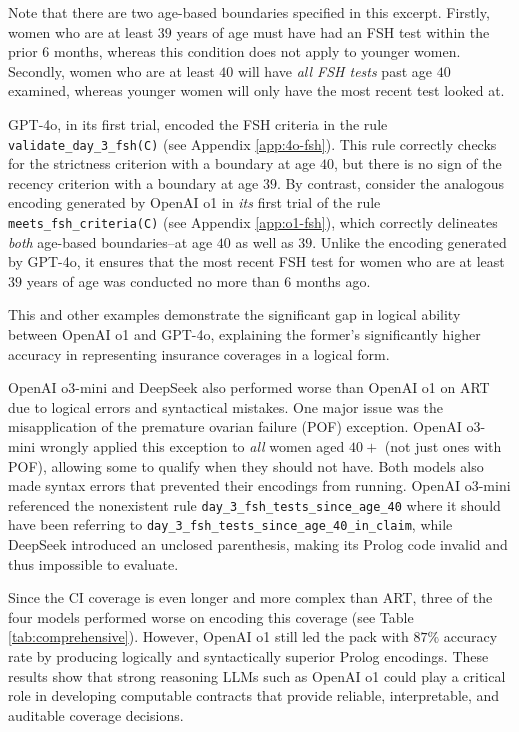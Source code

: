 Note that there are two age-based boundaries specified in this excerpt. Firstly, women who are at least $39$ years of age must have had an FSH test within the prior $6$ months, whereas this condition does not apply to younger women. Secondly, women who are at least $40$ will have \emph{all FSH tests} past age $40$ examined, whereas younger women will only have the most recent test looked at.

GPT-4o, in its first trial, encoded the FSH criteria in the rule \verb|validate_day_3_fsh(C)| (see Appendix \ref{app:4o-fsh}). This rule correctly checks for the strictness criterion with a boundary at age $40$, but there is no sign of the recency criterion with a boundary at age $39$. By contrast, consider the analogous encoding generated by OpenAI o1 in \emph{its} first trial of the rule \verb|meets_fsh_criteria(C)| (see Appendix \ref{app:o1-fsh}), which correctly delineates \emph{both} age-based boundaries--at age $40$ as well as $39$. Unlike the encoding generated by GPT-4o, it ensures that the most recent FSH test for women who are at least $39$ years of age was conducted no more than $6$ months ago.

This and other examples demonstrate the significant gap in logical ability between OpenAI o1 and GPT-4o, explaining the former's significantly higher accuracy in representing insurance coverages in a logical form.

OpenAI o3-mini and DeepSeek also performed worse than OpenAI o1 on ART due to logical errors and syntactical mistakes. One major issue was the misapplication of the premature ovarian failure (POF) exception. OpenAI o3-mini wrongly applied this exception to \emph{all} women aged $40+$ (not just ones with POF), allowing some to qualify when they should not have. Both models also made syntax errors that prevented their encodings from running. OpenAI o3-mini referenced the nonexistent rule \texttt{day\_3\_fsh\_tests\_since\_age\_40} where it should have been referring to \texttt{day\_3\_fsh\_tests\_since\_age\_40\_in\_claim}, while DeepSeek introduced an unclosed parenthesis, making its Prolog code invalid and thus impossible to evaluate.

Since the CI coverage is even longer and more complex than ART, three of the four models performed worse on encoding this coverage (see Table \ref{tab:comprehensive}). However, OpenAI o1 still led the pack with $87\%$ accuracy rate by producing logically and syntactically superior Prolog encodings. These results show that strong reasoning LLMs such as OpenAI o1 could play a critical role in developing computable contracts that provide reliable, interpretable, and auditable coverage decisions. 

